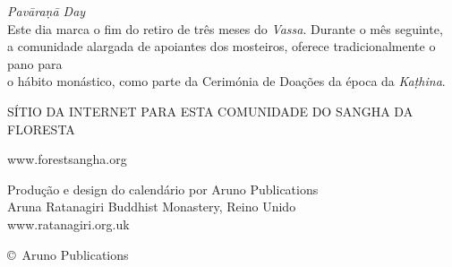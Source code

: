 {{\emph{Pavāraṇā Day} \spacedcdot\ \xDatePavarana\\
Este dia marca o fim do retiro de três meses do \emph{Vassa}. Durante o mês seguinte,\\
a comunidade alargada de apoiantes dos mosteiros, oferece tradicionalmente o pano para\\
o hábito monástico, como parte da Cerimónia de Doações da época da \emph{Kaṭhina}.

\bigskip

{\large SÍTIO DA INTERNET PARA ESTA COMUNIDADE DO SANGHA DA FLORESTA}

www.forestsangha.org

\bigskip

Produção e design do calendário por Aruno Publications\\
Aruna Ratanagiri Buddhist Monastery, Reino Unido\\
www.ratanagiri.org.uk

\copyright\ Aruno Publications \CopyrightYear\\

\vfill
\mbox{}
}}

